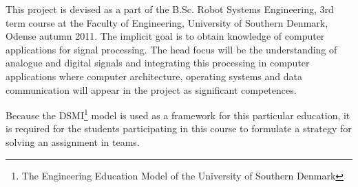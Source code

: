 This project is devised as a part of the B.Sc. Robot Systems Engineering, 3rd term course at the Faculty of Engineering, University of Southern Denmark, Odense autumn 2011. The implicit goal is to obtain knowledge of computer applications for signal processing. The head focus will be the understanding of analogue and digital signals and integrating this processing in computer applications where computer architecture, operating systems and data communication will appear in the project as significant competences.

Because the DSMI\footnote{The Engineering Education Model of the University of Southern Denmark} model is used as a framework for this particular education, it is required for the students participating in this course to formulate a strategy for solving an assignment in teams.